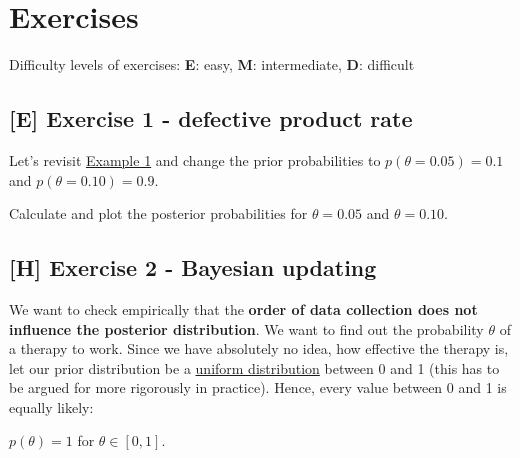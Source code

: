 \documentclass[
]{book}
\begin{document}
\section{Exercises}\label{exercises-3}

Difficulty levels of exercises:
\textbf{E}: easy,
\textbf{M}: intermediate,
\textbf{D}: difficult

\subsection{{[}E{]} Exercise 1 - defective product rate}\label{exercise_defective_product_rate}

Let's revisit \hyperref[example_defective_products]{Example 1} and change the prior probabilities to
\(p(\theta = 0.05) = 0.1\) and \(p(\theta = 0.10) = 0.9\).

Calculate and plot the posterior probabilities for \(\theta = 0.05\) and \(\theta = 0.10\).

\subsection{{[}H{]} Exercise 2 - Bayesian updating}\label{h-exercise-2---bayesian-updating}

We want to check empirically that the \textbf{order of data collection does not influence the posterior distribution}.
We want to find out the probability \(\theta\) of a therapy to work.
Since we have absolutely no idea, how effective the therapy is, let our prior distribution be a \href{https://en.wikipedia.org/wiki/Continuous_uniform_distribution}{uniform
distribution} between 0 and 1
(this has to be argued for more rigorously in practice). Hence,
every value between 0 and 1 is equally likely:

\(p(\theta) = 1\) for \(\theta \in [0,1]\).
\end{document}
